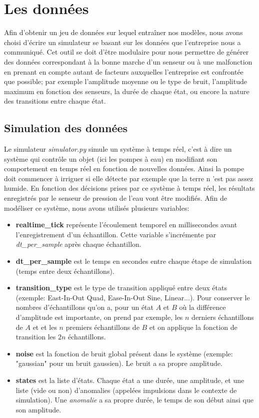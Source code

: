 \documentclass[french]{article}
\theoremstyle{mytheoremstyle}
\theoremstyle{mytheoremstyle}
\theoremstyle{myproblemstyle}
\begin{document}
    \section{Les données}
    Afin d'obtenir un jeu de données sur lequel entraîner nos modèles, nous avons choisi d'écrire un simulateur se basant sur les données que l'entreprise nous a communiqué. Cet outil se doit d'être modulaire pour nous permettre de générer des données correspondant à la bonne marche d'un senseur ou à une malfonction en prenant en compte autant de facteurs auxquelles l'entreprise est confrontée que possible; par exemple l'amplitude moyenne ou le type de bruit, l'amplitude maximum en fonction des senseurs, la durée de chaque état, ou encore la nature des transitions entre chaque état.
        \subsection{Simulation des données}
        Le simulateur \textit{simulator.py} simule un système à temps réel, c'est à dire un système qui contrôle un objet (ici les pompes à eau) en modifiant son comportement en temps réel en fonction de nouvelles données. Ainsi la pompe doit commencer à irriguer si elle détecte par exemple que la terre n 'est pas assez humide. En fonction des décisions prises par ce système à temps réel, les résultats enregistrés par le senseur de pression de l'eau vont être modifiés. Afin de modéliser ce système, nous avons utilisés plusieurs variables:
        \begin{itemize}[label={•}]
            \item \textbf{realtime\_tick} représente l'écoulement temporel en millisecondes avant l'enregistrement d'un échantillon. Cette variable s'incrémente par \textit{dt\_per\_sample} après chaque échantillon.
            \item \textbf{dt\_per\_sample} est le temps en secondes entre chaque étape de simulation (temps entre deux échantillons).
            \item \textbf{transition\_type} est le type de transition appliqué entre deux états (exemple: East-In-Out Quad, Ease-In-Out Sine, Linear...). Pour conserver le nombres d'échantillons qu'on a, pour un état $A$ et $B$ où la différence d'amplitude est importante, on prend par exemple, les $n$ derniers échantillons de $A$ et et les $n$ premiers échantillons de $B$ et on applique la fonction de transition les $2n$ échantillons.
            \item \textbf{noise} est la fonction de bruit global présent dans le système (exemple: "gaussian" pour un bruit gaussien). Le bruit a sa propre amplitude. 
            \item \textbf{states} est la liste d'états. Chaque état a une durée, une amplitude, et une liste (vide ou non) d'anomalies (appelées impulsions dans le contexte de simulation). Une \textit{anomalie} a sa propre durée, le temps de son début ainsi que son amplitude.
        \end{itemize}
\end{document}
